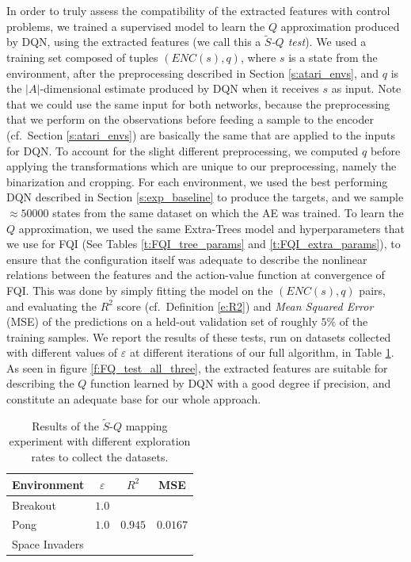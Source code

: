 In order to truly assess the compatibility of the extracted features 
with control problems, we trained a supervised model to learn the $Q$ 
approximation produced by DQN, using the extracted features (we call this 
a \textit{$\tilde{S}$-$Q$ test}). 
We used a training set composed of tuples $(ENC(s), q)$, where $s$ is a 
state from the environment, after the preprocessing described in Section 
\ref{s:atari_envs}, and $q$ is the $|A|$-dimensional estimate produced by DQN 
when it receives $s$ as input. Note that we could use the same input
for both networks, because the preprocessing that we perform on the observations 
before feeding a sample to the encoder (cf.\ Section \ref{s:atari_envs}) 
are basically the same that are applied to the inputs for DQN. To account for 
the slight different preprocessing, we computed $q$ before applying the 
transformations which are unique to our preprocessing, namely the binarization 
and cropping. 
For each environment, we used the best performing DQN described in Section 
\ref{s:exp_baseline} to produce the targets, and we sample $\approx50000$ states
from the same dataset on which the AE was trained.
To learn the $Q$ approximation, we used the same Extra-Trees model and 
hyperparameters that we use for FQI (See Tables \ref{t:FQI_tree_params} and
\ref{t:FQI_extra_params}), to ensure that the configuration itself was 
adequate to describe the nonlinear relations between the features and the 
action-value function at convergence of FQI. 
This was done by simply fitting the model on the $(ENC(s), q)$ pairs, and 
evaluating the $R^2$ score (cf.\ Definition \eqref{e:R2}) and \textit{Mean 
Squared Error} (MSE) of the predictions on a held-out validation set of roughly 
$5\%$ of the training samples.
We report the results of these tests, run on datasets collected with different
values of $\varepsilon$ at different iterations of our full algorithm, in 
Table \ref{t:FQ_tests}.
As seen in figure \ref{f:FQ_test_all_three}, the extracted features are suitable for 
describing the $Q$ function learned by DQN with a good degree if precision, and 
constitute an adequate base for our whole approach. 
%
\begin{table}
    \centering
    \begin{tabular}{l c c c} 
	\hline
	Environment    & $\varepsilon$ & $R^2$   & MSE \\ 
	\hline 
	Breakout       & $1.0$         & $ $     & $ $ \\
	Pong 	       & $1.0$         & $0.945$ & $0.0167$ \\
	Space Invaders & $ $           & $ $     & $ $ \\
	\hline
    \end{tabular}
    \caption[Results of $\tilde{S}$-$Q$ mapping experiment]{Results of the 
	     $\tilde{S}$-$Q$ mapping experiment with different exploration rates
	     to collect the datasets.}
    \label{t:FQ_tests}
\end{table}
